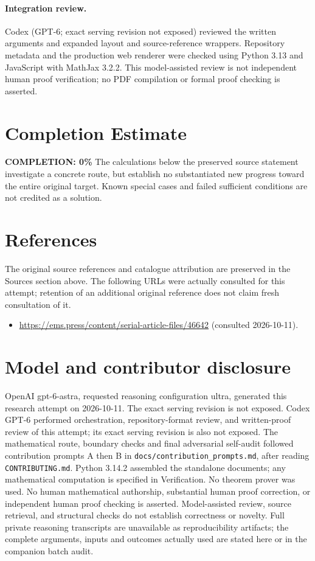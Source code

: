 \documentclass[11pt]{article}
\begin{document}
\paragraph{Integration review.} Codex (GPT-6; exact serving revision not exposed) reviewed the written arguments and expanded layout and source-reference wrappers. Repository metadata and the production web renderer were checked using Python 3.13 and JavaScript with MathJax 3.2.2. This model-assisted review is not independent human proof verification; no PDF compilation or formal proof checking is asserted.

\section{Completion Estimate}
\noindent\textbf{COMPLETION: 0\%}
The calculations below the preserved source statement investigate a concrete route,
but establish no substantiated new progress toward the entire original target.
Known special cases and failed sufficient conditions are not credited as a solution.
\section{References}
The original source references and catalogue attribution are preserved in the
Sources section above. The following URLs were actually consulted for this attempt;
retention of an additional original reference does not claim fresh consultation of it.
\begin{itemize}
\item \url{https://ems.press/content/serial-article-files/46642} (consulted 2026-10-11). 
\end{itemize}
\section{Model and contributor disclosure}
OpenAI gpt-6-astra, requested reasoning configuration ultra, generated this research
attempt on 2026-10-11. The exact serving revision is not exposed. Codex GPT-6
performed orchestration, repository-format review, and written-proof review of this attempt; its exact serving revision
is also not exposed. The mathematical route, boundary checks and final adversarial
self-audit followed contribution prompts A then B in
\texttt{docs/contribution\_prompts.md}, after reading \texttt{CONTRIBUTING.md}.
Python 3.14.2 assembled the standalone documents; any mathematical computation is
specified in Verification. No theorem prover was used. No human mathematical
authorship, substantial human proof correction, or independent human proof checking
is asserted. Model-assisted review, source retrieval, and structural checks do not
establish correctness or novelty. Full private reasoning transcripts are unavailable
as reproducibility artifacts; the complete arguments, inputs and outcomes actually
used are stated here or in the companion batch audit.
\end{document}
